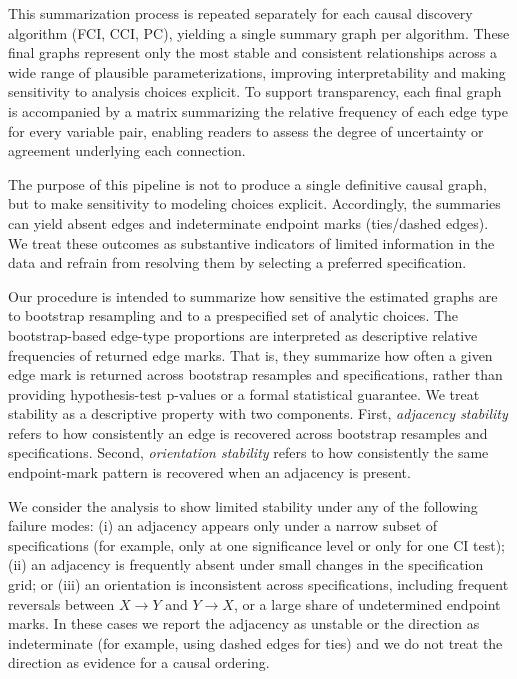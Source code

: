 \documentclass[
]{article}
\begin{document}
This summarization process is repeated separately for each causal
discovery algorithm (FCI, CCI, PC),
\textcolor{BrickRed}{yielding a single summary graph per algorithm. These final graphs represent only the most stable and consistent relationships across a wide range of plausible parameterizations, improving interpretability and making sensitivity to analysis choices explicit.}
To support transparency, each final graph is accompanied by a matrix
summarizing the relative frequency of each edge type for every variable
pair, enabling readers to assess the degree of uncertainty or agreement
underlying each connection.

\textcolor{BrickRed}{The purpose of this pipeline is not to produce a single definitive causal graph, but to make sensitivity to modeling choices explicit. Accordingly, the summaries can yield absent edges and indeterminate endpoint marks (ties/dashed edges). We treat these outcomes as substantive indicators of limited information in the data and refrain from resolving them by selecting a preferred specification.}

\textcolor{BrickRed}{Our procedure is intended to summarize how sensitive the estimated graphs are to bootstrap resampling and to a prespecified set of analytic choices. The bootstrap-based edge-type proportions are interpreted as descriptive relative frequencies of returned edge marks. That is, they summarize how often a given edge mark is returned across bootstrap resamples and specifications, rather than providing hypothesis-test p-values or a formal statistical guarantee. We treat stability as a descriptive property with two components. First, \emph{adjacency stability} refers to how consistently an edge is recovered across bootstrap resamples and specifications. Second, \emph{orientation stability} refers to how consistently the same endpoint-mark pattern is recovered when an adjacency is present.}

\textcolor{BrickRed}{We consider the analysis to show limited stability under any of the following failure modes: (i) an adjacency appears only under a narrow subset of specifications (for example, only at one significance level or only for one CI test); (ii) an adjacency is frequently absent under small changes in the specification grid; or (iii) an orientation is inconsistent across specifications, including frequent reversals between $X \rightarrow Y$ and $Y \rightarrow X$, or a large share of undetermined endpoint marks. In these cases we report the adjacency as unstable or the direction as indeterminate (for example, using dashed edges for ties) and we do not treat the direction as evidence for a causal ordering.}
\end{document}
